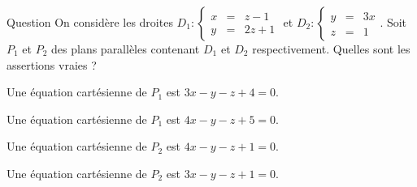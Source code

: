 \begin{multi}[multiple,feedback=
{\(D_1\) passe par le point \(A_1(-1,1,0)\) et est dirigée par le vecteur \(\vec{u_1}(1,2,1)\). 
\(D_2\) passe par le point \(A_2(0,0,1)\) et est dirigée par le vecteur \(\vec{u_2}(1,3,0)\). \(P_1\) passe donc par \(A_1\) est de vecteur normal  \(\vec{n}=\vec{u_1} \wedge \vec{u_2}\) et \(P_2\) passe donc par \(A_2\) est de vecteur normal  \(\vec{n}\).
}]{Question}
On considère les droites \(D_1 : \left\{\begin{array}{ccl}x&=&z-1\\y&=&2z+1 \end{array}\right.\) et  
\(D_2 : \left\{\begin{array}{ccl}y&=&3x\\z&=&1 \end{array}\right.\). Soit \(P_1\) et \(P_2\) des plans parallèles contenant \(D_1\) et \(D_2\) respectivement.    Quelles sont les assertions vraies ?

    \item* Une équation cartésienne de \(P_1\) est \( 3x-y-z+4=0\).
    \item Une équation cartésienne de \(P_1\) est \( 4x-y-z+5=0\).
    \item Une équation cartésienne de \(P_2\) est \( 4x-y-z+1=0\).
    \item* Une équation cartésienne de \(P_2\) est \( 3x-y-z+1=0\).
\end{multi}



